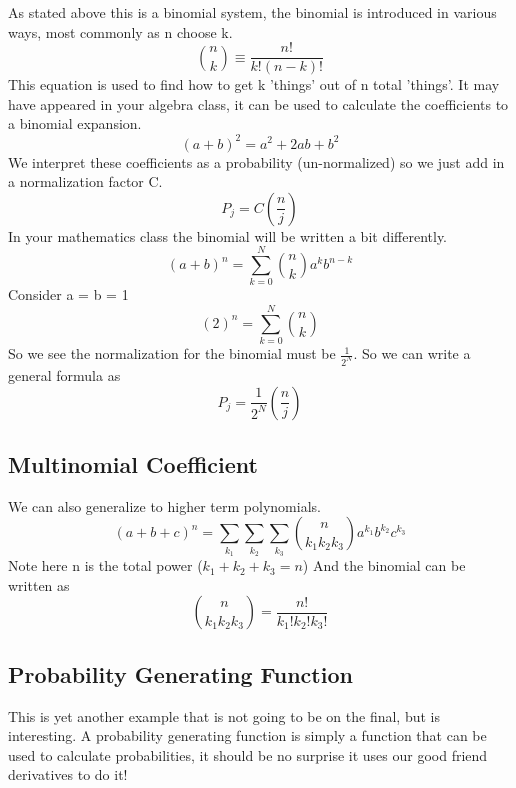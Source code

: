 \documentclass{article}
\begin{document}
As stated above this is a binomial system, the binomial is introduced in various ways, most commonly as n choose k. 
\begin{equation}
\binom{n}{k} \equiv \frac{n!}{k! (n-k)!}
\end{equation}
This equation is used to find how to get k 'things' out of n total 'things'. 
It may have appeared in your algebra class, it can be used to calculate the coefficients to a binomial expansion. 
\begin{equation}
(a+b)^2 = a^2 + 2ab+ b^2
\end{equation}
We interpret these coefficients as a probability (un-normalized) so we just add in a normalization factor C. 
\begin{equation}
P_j = C\left(\frac{n}{j} \right)
\end{equation}
In your mathematics class the binomial will be written a bit differently. 
\begin{equation}
(a+b)^n = \sum_{k=0}^N \binom{n}{k}a^kb^{n-k}
\end{equation}
Consider a = b = 1
\begin{equation}
(2)^n = \sum_{k=0}^N \binom{n}{k}
\end{equation}
So we see the normalization for the binomial must be $\frac{1}{2^N}$. 
So we can write a general formula as 
\begin{equation}
P_j = \frac{1}{2^N}\left(\frac{n}{j} \right)
\end{equation}

\subsection*{Multinomial Coefficient}
We can also generalize to higher term polynomials. 
\begin{equation}
(a+b+c)^n = \sum_{k_1}\sum_{k_2}\sum_{k_3}\binom{n}{k_1 k_2 k_3} a^{k_1}b^{k_2}c^{k_3}
\end{equation}
Note here n is the total power ($k_1+k_2+k_3 = n$)
And the binomial can be written as 
\begin{equation}
\binom{n}{k_1 k_2 k_3} = \frac{n!}{k_1!k_2!k_3!}
\end{equation}


\subsection*{Probability Generating Function}
This is yet another example that is not going to be on the final, but is interesting. 
A probability generating function is simply a function that can be used to calculate probabilities, it should be no surprise it uses our good friend derivatives to do it!
\end{document}
